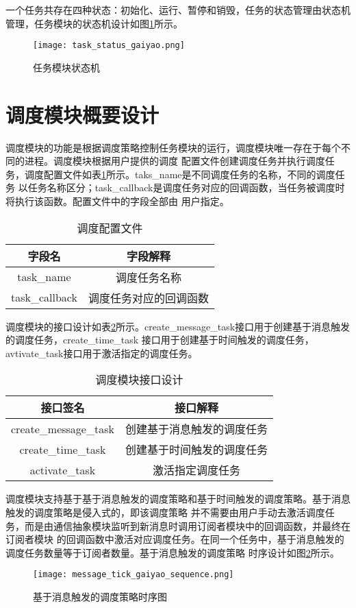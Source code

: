 一个任务共存在四种状态：初始化、运行、暂停和销毁，任务的状态管理由状态机管理，任务模块的状态机设计如图\ref{task_status_gaiyao}所示。
\begin{figure}[H]
  \centering
  \texttt{[image: task\_status\_gaiyao.png]}
  \caption{任务模块状态机}
  \label{task_status_gaiyao}
\end{figure}

\section{调度模块概要设计}
调度模块的功能是根据调度策略控制任务模块的运行，调度模块唯一存在于每个不同的进程。调度模块根据用户提供的调度
配置文件创建调度任务并执行调度任务，调度配置文件如表\ref{schedule_config_file}所示。taks\_name是不同调度任务的名称，不同的调度任务
以任务名称区分；task\_callback是调度任务对应的回调函数，当任务被调度时将执行该函数。配置文件中的字段全部由
用户指定。
\begin{table}[H]
  \centering\small
  \caption{调度配置文件}
  \label{schedule_config_file}
  \begin{tabular}{cc}
    \toprule
    字段名 & 字段解释 \\
    \midrule
    task\_name & 调度任务名称\\
    task\_callback & 调度任务对应的回调函数\\
    \bottomrule
  \end{tabular}
\end{table}

调度模块的接口设计如表\ref{schedule_interface}所示。create\_message\_task接口用于创建基于消息触发的调度任务，create\_time\_task
接口用于创建基于时间触发的调度任务，avtivate\_task接口用于激活指定的调度任务。
\begin{table}[H]
  \centering\small
  \caption{调度模块接口设计}
  \label{schedule_interface}
  \begin{tabular}{cc}
    \toprule
    接口签名 & 接口解释 \\
    \midrule
    create\_message\_task & 创建基于消息触发的调度任务 \\
    create\_time\_task & 创建基于时间触发的调度任务 \\
    activate\_task & 激活指定调度任务 \\
    \bottomrule
  \end{tabular}
\end{table}

调度模块支持基于基于消息触发的调度策略和基于时间触发的调度策略。基于消息触发的调度策略是侵入式的，即该调度策略
并不需要由用户手动去激活调度任务，而是由通信抽象模块监听到新消息时调用订阅者模块中的回调函数，并最终在订阅者模块
的回调函数中激活对应调度任务。在同一个任务中，基于消息触发的调度任务数量等于订阅者数量。基于消息触发的调度策略
时序设计如图\ref{message_tick_gaiyao_sequence}所示。
\begin{figure}[H]
  \centering
  \texttt{[image: message\_tick\_gaiyao\_sequence.png]}
  \caption{基于消息触发的调度策略时序图}
  \label{message_tick_gaiyao_sequence}
\end{figure}


